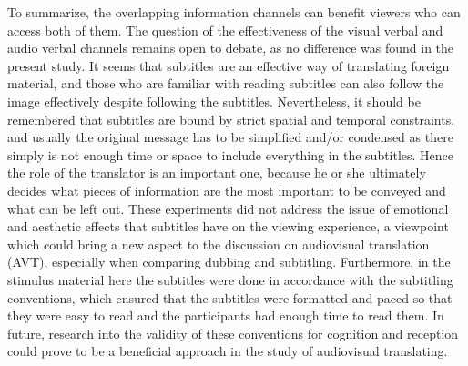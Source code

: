\documentclass[output=paper]{langsci/langscibook}
\begin{document}
To summarize, the overlapping information channels can benefit viewers who can access both of them. The question of the effectiveness of the visual verbal and audio verbal channels remains open to debate, as no difference was found in the present study. It seems that subtitles are an effective way of translating foreign material, and those who are familiar with reading subtitles can also follow the image effectively despite following the subtitles. Nevertheless, it should be remembered that subtitles are bound by strict spatial and temporal constraints, and usually the original message has to be simplified and/or condensed as there simply is not enough time or space to include everything in the subtitles. Hence the role of the translator is an important one, because he or she ultimately decides what pieces of information are the most important to be conveyed and what can be left out. These experiments did not address the issue of emotional and aesthetic effects that subtitles have on the viewing experience, a viewpoint which could bring a new aspect to the discussion on audiovisual translation (AVT), especially when comparing dubbing and subtitling. Furthermore, in the stimulus material here the subtitles were done in accordance with the subtitling conventions, which ensured that the subtitles were formatted and paced so that they were easy to read and the participants had enough time to read them. In future, research into the validity of these conventions for cognition and reception could prove to be a beneficial approach in the study of audiovisual translating.
\end{document}
